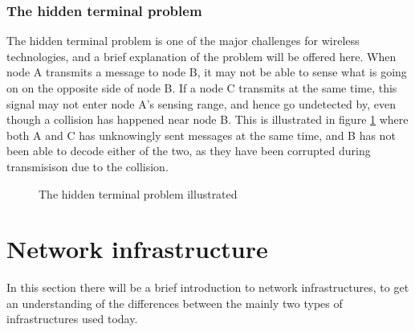      \subsubsection{The hidden terminal problem}
     The hidden terminal problem is one of the major challenges for wireless technologies, and a brief explanation of the problem will be offered here.
		 When node A transmits a message to node B, it may not be able to sense what is going on
     on the opposite side of node B. If a node C transmits at the same time, this signal may not enter node A's sensing range, and
     hence go undetected by, even though a collision has happened near node B. This is illustrated in figure \ref{fig:hiddenterminal} where
     both A and C has unknowingly sent messages at the same time, and B has not been able to decode either of the two, as they have been corrupted during
		 transmisison due to the collision. 

     \begin{figure}
     \center

     \caption{The hidden terminal problem illustrated}
     \label{fig:hiddenterminal}
     \end{figure}


\section{Network infrastructure}
		In this section there will be a brief introduction to network infrastructures, to get an understanding of the differences between the mainly two types of infrastructures used today. 
